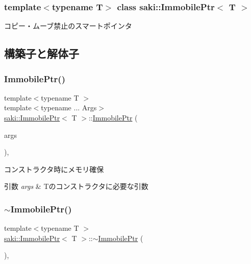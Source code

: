 \subsubsection*{template$<$typename T$>$\newline
class saki\+::\+Immobile\+Ptr$<$ T $>$}

コピー・ムーブ禁止のスマートポインタ 

\subsection{構築子と解体子}
\mbox{\label{classsaki_1_1_immobile_ptr_a5b990c72b4222f49b160f4ed5d0c77f9}} 
\subsubsection{\texorpdfstring{Immobile\+Ptr()}{ImmobilePtr()}\hspace{0.1cm}{\footnotesize\ttfamily [1/3]}}
{\footnotesize\ttfamily template$<$typename T $>$ \\
template$<$typename ... Args$>$ \\
\mbox{\hyperlink{classsaki_1_1_immobile_ptr}{saki\+::\+Immobile\+Ptr}}$<$ T $>$\+::\mbox{\hyperlink{classsaki_1_1_immobile_ptr}{Immobile\+Ptr}} (\begin{DoxyParamCaption}\item[{Args...}]{args }\end{DoxyParamCaption})\hspace{0.3cm}{\ttfamily [inline]}, {\ttfamily [explicit]}}



コンストラクタ時にメモリ確保 


\begin{DoxyParams}{引数}
{\em args} & Tのコンストラクタに必要な引数 \\
\hline
\end{DoxyParams}
\mbox{\label{classsaki_1_1_immobile_ptr_ac51507648866a294082a9f38796ca5e4}} 
\subsubsection{\texorpdfstring{$\sim$\+Immobile\+Ptr()}{~ImmobilePtr()}}
{\footnotesize\ttfamily template$<$typename T $>$ \\
\mbox{\hyperlink{classsaki_1_1_immobile_ptr}{saki\+::\+Immobile\+Ptr}}$<$ T $>$\+::$\sim$\mbox{\hyperlink{classsaki_1_1_immobile_ptr}{Immobile\+Ptr}} (\begin{DoxyParamCaption}{ }\end{DoxyParamCaption})\hspace{0.3cm}{\ttfamily [inline]}, {\ttfamily [noexcept]}}



